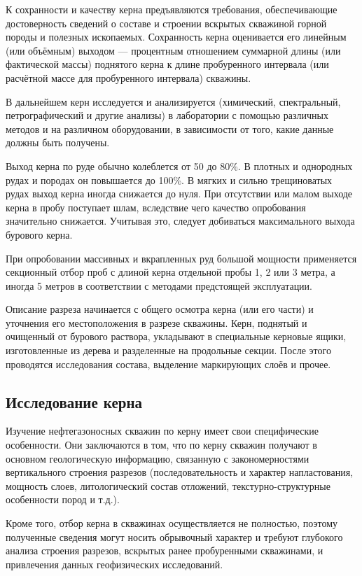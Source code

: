 \documentclass[14pt]{matmex-diploma}
\begin{document}
        К сохранности и качеству керна предъявляются требования, обеспечивающие достоверность сведений о составе и строении вскрытых скважиной горной породы и полезных ископаемых. Сохранность керна оценивается его линейным (или объёмным) выходом — процентным отношением суммарной длины (или фактической массы) поднятого керна к длине пробуренного интервала (или расчётной массе для пробуренного интервала) скважины.
        
        В дальнейшем керн исследуется и анализируется (химический, спектральный, петрографический и другие анализы) в лаборатории с помощью различных методов и на различном оборудовании, в зависимости от того, какие данные должны быть получены.
        
        Выход керна по руде обычно колеблется от 50 до 80\%. В плотных и однородных рудах и породах он повышается до 100\%. В мягких и сильно трещиноватых рудах выход керна иногда снижается до нуля. При отсутствии или малом выходе керна в пробу поступает шлам, вследствие чего качество опробования значительно снижается. Учитывая это, следует добиваться максимального выхода бурового керна.
        
        При опробовании массивных и вкрапленных руд большой мощности применяется секционный отбор проб с длиной керна отдельной пробы 1, 2 или 3 метра, а иногда 5 метров в соответствии с методами предстоящей эксплуатации.
        
        Описание разреза начинается с общего осмотра керна (или его части) и уточнения его местоположения в разрезе скважины. Керн, поднятый и очищенный от бурового раствора, укладывают в специальные керновые ящики, изготовленные из дерева и разделенные на продольные секции. После этого проводятся исследования состава, выделение маркирующих слоёв и прочее.
        
    \subsection*{Исследование керна}
    
        Изучение нефтегазоносных скважин по керну имеет свои специфические особенности. Они заключаются в том, что по керну скважин получают в основном геологическую информацию, связанную с закономерностями вертикального строения разрезов (последовательность и характер напластования, мощность слоев, литологический состав отложений, текстурно-структурные особенности пород и т.д.).
        
        Кроме того, отбор керна в скважинах осуществляется не полностью, поэтому полученные сведения могут носить обрывочный характер и требуют глубокого анализа строения разрезов, вскрытых ранее пробуренными скважинами, и привлечения данных геофизических исследований.
        
\end{document}
